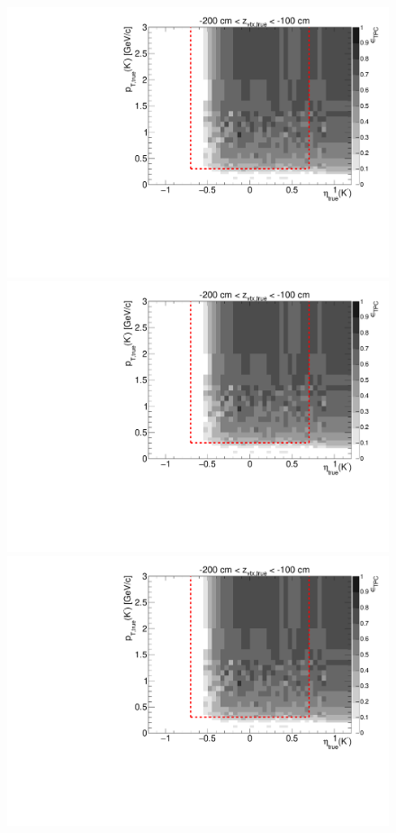 \begin{figure}[hb]\ContinuedFloat
\centering
\parbox{0.495\textwidth}{
  \centering
  \includegraphics[width=\linewidth,page=11]{graphics/eff/Eff2D_TPC_kaon_Minus.pdf}\\
  \includegraphics[width=\linewidth,page=13]{graphics/eff/Eff2D_TPC_kaon_Minus.pdf}\\
  \includegraphics[width=\linewidth,page=15]{graphics/eff/Eff2D_TPC_kaon_Minus.pdf}\\
}
\end{figure}
